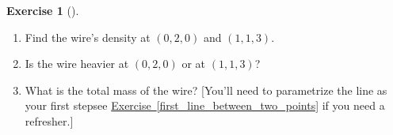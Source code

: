 \documentclass[10pt,]{book}
\theoremstyle{plain}
\theoremstyle{definition}
\theoremstyle{definition}
\theoremstyle{definition}
\theoremstyle{definition}
\newtheorem{exploration}[project]{Exercise}
\theoremstyle{definition}
\numberwithin{equation}{section}
\begin{document}
\begin{exploration}[]\label{exploration-218}
\leavevmode%
\begin{enumerate}[font=\bfseries,label=(\alph*),ref=\alph*]
\item\label{task-561} Find the wire's density at \((0,2,0)\) and \((1,1,3)\).%
\item\label{task-562} Is the wire heavier at \((0,2,0)\) or at \((1,1,3)\)?%
\item\label{task-563} What is the total mass of the wire?  [You'll need to parametrize the line as your first step\textemdash{}see \hyperref[first_line_between_two_points]{Exercise~\ref{first_line_between_two_points}} if you need a refresher.]%
\end{enumerate}
\end{exploration}
\typeout{************************************************}
\typeout{************************************************}
\end{document}
